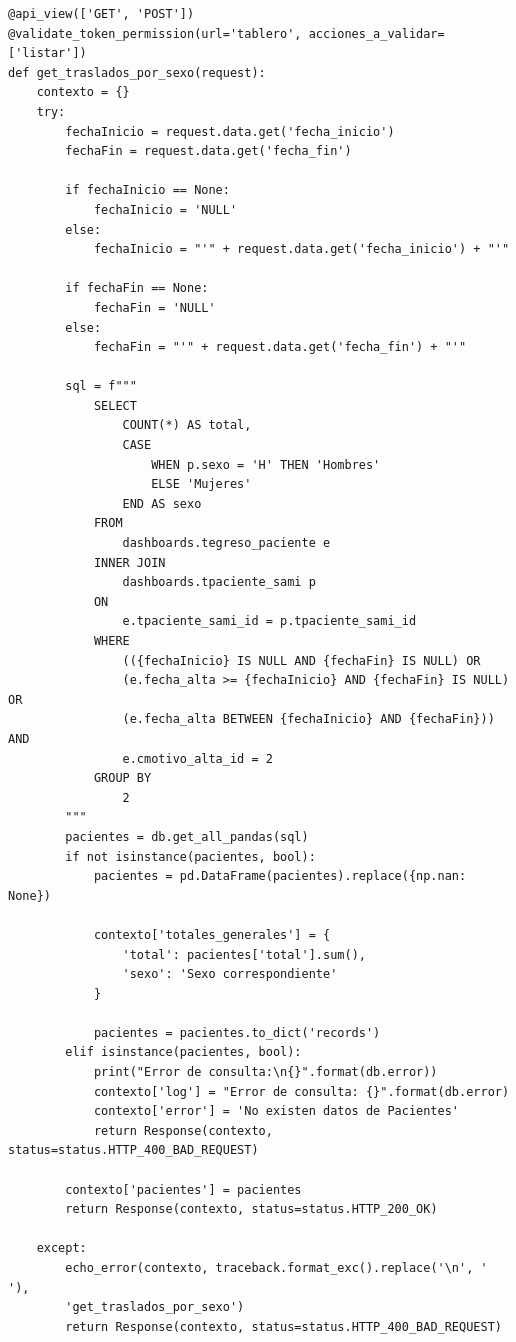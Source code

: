 \begin{verbatim}
@api_view(['GET', 'POST'])
@validate_token_permission(url='tablero', acciones_a_validar=['listar'])
def get_traslados_por_sexo(request):
    contexto = {}
    try:
        fechaInicio = request.data.get('fecha_inicio')
        fechaFin = request.data.get('fecha_fin')
        
        if fechaInicio == None:
            fechaInicio = 'NULL'
        else:
            fechaInicio = "'" + request.data.get('fecha_inicio') + "'"

        if fechaFin == None:
            fechaFin = 'NULL'
        else:
            fechaFin = "'" + request.data.get('fecha_fin') + "'"
            
        sql = f"""
            SELECT
                COUNT(*) AS total,
                CASE
                    WHEN p.sexo = 'H' THEN 'Hombres'
                    ELSE 'Mujeres'
                END AS sexo
            FROM
                dashboards.tegreso_paciente e
            INNER JOIN
                dashboards.tpaciente_sami p
            ON 
                e.tpaciente_sami_id = p.tpaciente_sami_id 
            WHERE
                (({fechaInicio} IS NULL AND {fechaFin} IS NULL) OR 
                (e.fecha_alta >= {fechaInicio} AND {fechaFin} IS NULL) OR 
                (e.fecha_alta BETWEEN {fechaInicio} AND {fechaFin})) AND
                e.cmotivo_alta_id = 2
            GROUP BY
                2
        """
        pacientes = db.get_all_pandas(sql)
        if not isinstance(pacientes, bool):
            pacientes = pd.DataFrame(pacientes).replace({np.nan: None})

            contexto['totales_generales'] = {
                'total': pacientes['total'].sum(),
                'sexo': 'Sexo correspondiente'
            }

            pacientes = pacientes.to_dict('records')
        elif isinstance(pacientes, bool):
            print("Error de consulta:\n{}".format(db.error))
            contexto['log'] = "Error de consulta: {}".format(db.error)
            contexto['error'] = 'No existen datos de Pacientes'
            return Response(contexto, status=status.HTTP_400_BAD_REQUEST)

        contexto['pacientes'] = pacientes
        return Response(contexto, status=status.HTTP_200_OK)

    except:
        echo_error(contexto, traceback.format_exc().replace('\n', ' '), 
        'get_traslados_por_sexo')
        return Response(contexto, status=status.HTTP_400_BAD_REQUEST)
\end{verbatim}


